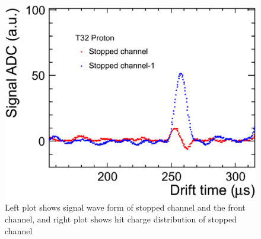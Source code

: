 
\begin{figure}[htbp]
  \begin{center}
    \includegraphics[width=1.0\hsize,clip]{fig/cross_talk_1.eps}
  \end{center}
  \caption{Left plot shows signal wave form of stopped channel and the front channel, 
    and right plot shows hit charge distribution of stopped channel}
  \label{fig:cross_talk1}
  \label{fig:cross_talk2}
\end{figure}
